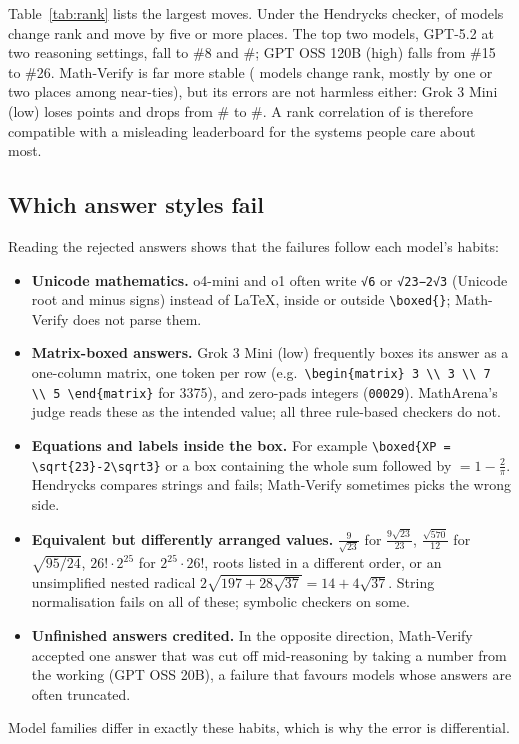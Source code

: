 \documentclass[11pt]{article}
\begin{document}
Table~\ref{tab:rank} lists the largest moves. Under the Hendrycks checker, \hendrycksModelsMoved{} of \maModels{} models change rank and \hendrycksModelsMovedFive{} move by five or more places.
The top two models, GPT-5.2 at two reasoning settings, fall to \#8 and \#\gptHenRank{}; GPT OSS 120B (high) falls from \#15 to \#26.
Math-Verify is far more stable (\mathverifyModelsMoved{} models change rank, mostly by one or two places among near-ties), but its errors are not harmless either: Grok 3 Mini (low) loses \grokMVDrop{} points and drops from \#\grokRefRank{} to \#\grokMVRank{}.
A rank correlation of \hendrycksSpearman{} is therefore compatible with a misleading leaderboard for the systems people care about most.

\subsection{Which answer styles fail}\label{sec:styles}

Reading the rejected answers shows that the failures follow each model's habits:
\begin{itemize}
  \item \textbf{Unicode mathematics.} o4-mini and o1 often write \texttt{√6} or \texttt{√23−2√3} (Unicode root and minus signs) instead of \LaTeX, inside or outside \verb|\boxed{}|; Math-Verify does not parse them.
  \item \textbf{Matrix-boxed answers.} Grok 3 Mini (low) frequently boxes its answer as a one-column matrix, one token per row (e.g.\ \verb|\begin{matrix} 3 \\ 3 \\ 7 \\ 5 \end{matrix}| for 3375), and zero-pads integers (\texttt{00029}). MathArena's judge reads these as the intended value; all three rule-based checkers do not.
  \item \textbf{Equations and labels inside the box.} For example \verb|\boxed{XP = \sqrt{23}-2\sqrt3}| or a box containing the whole sum followed by ${}=1-\frac{2}{\pi}$. Hendrycks compares strings and fails; Math-Verify sometimes picks the wrong side.
  \item \textbf{Equivalent but differently arranged values.} $\frac{9}{\sqrt{23}}$ for $\frac{9\sqrt{23}}{23}$, $\frac{\sqrt{570}}{12}$ for $\sqrt{95/24}$, $26!\cdot 2^{25}$ for $2^{25}\cdot 26!$, roots listed in a different order, or an unsimplified nested radical $2\sqrt{197+28\sqrt{37}}=14+4\sqrt{37}$. String normalisation fails on all of these; symbolic checkers on some.
  \item \textbf{Unfinished answers credited.} In the opposite direction, Math-Verify accepted one answer that was cut off mid-reasoning by taking a number from the working (GPT OSS 20B), a failure that favours models whose answers are often truncated.
\end{itemize}
Model families differ in exactly these habits, which is why the error is differential.
\end{document}
